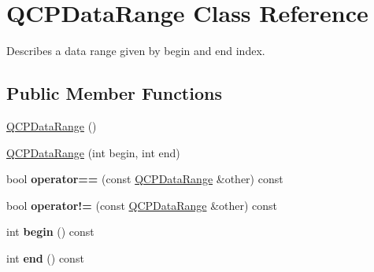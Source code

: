 \hypertarget{classQCPDataRange}{}\section{Q\+C\+P\+Data\+Range Class Reference}
\label{classQCPDataRange}


Describes a data range given by begin and end index.  


\subsection*{Public Member Functions}
\begin{DoxyCompactItemize}
\item 
\hyperlink{classQCPDataRange_a49e72fd9bace1da9d875136dcc04c986}{Q\+C\+P\+Data\+Range} ()
\item 
\hyperlink{classQCPDataRange_a6c7f4a3684210423270515403060e9cf}{Q\+C\+P\+Data\+Range} (int begin, int end)
\item 
bool {\bfseries operator==} (const \hyperlink{classQCPDataRange}{Q\+C\+P\+Data\+Range} \&other) const \hypertarget{classQCPDataRange_a6947b187a6562b98e22e32a5f9663de2}{}\label{classQCPDataRange_a6947b187a6562b98e22e32a5f9663de2}

\item 
bool {\bfseries operator!=} (const \hyperlink{classQCPDataRange}{Q\+C\+P\+Data\+Range} \&other) const \hypertarget{classQCPDataRange_a8eaea2a7c791e7ef494b03af547417a4}{}\label{classQCPDataRange_a8eaea2a7c791e7ef494b03af547417a4}

\item 
int {\bfseries begin} () const \hypertarget{classQCPDataRange_a6b14c93d5010e973427b8ecaebf77864}{}\label{classQCPDataRange_a6b14c93d5010e973427b8ecaebf77864}

\item 
int {\bfseries end} () const \hypertarget{classQCPDataRange_add50cb7075b68a0dd35fb5c962c81bbf}{}\label{classQCPDataRange_add50cb7075b68a0dd35fb5c962c81bbf}


\end{DoxyCompactItemize}
